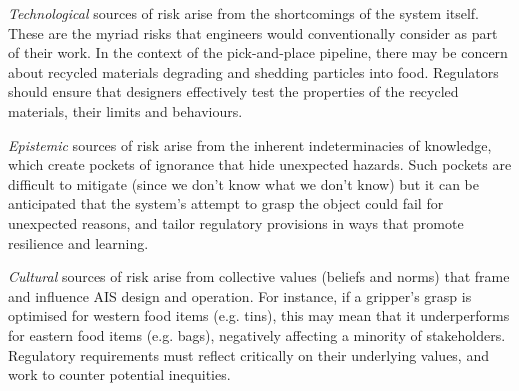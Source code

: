 \documentclass[lettersize,journal]{IEEEtran}
\begin{document}
\emph{Technological} sources of risk arise from the shortcomings of the system itself. These are the myriad risks that engineers would conventionally consider as part of their work. In the context of the pick-and-place pipeline, there may be  concern about recycled materials degrading and shedding particles into food. Regulators should ensure that designers effectively test the properties of the recycled materials, their limits and behaviours.

\emph{Epistemic} sources of risk arise from the inherent indeterminacies of knowledge, which create pockets of ignorance that hide unexpected hazards. Such pockets are difficult to mitigate (since we don’t know what we don’t know) but it can be anticipated that the system’s attempt to grasp the object could fail for unexpected reasons, and tailor regulatory provisions in ways that promote resilience and learning. 

\emph{Cultural} sources of risk arise from collective values (beliefs and norms) that frame and influence AIS design and operation. For instance, if a gripper’s grasp is optimised for western food items (e.g. tins), this may mean that it underperforms for eastern food items (e.g. bags), negatively affecting a minority of stakeholders. Regulatory requirements must reflect critically on their underlying values, and work to counter potential inequities. 
\end{document}
